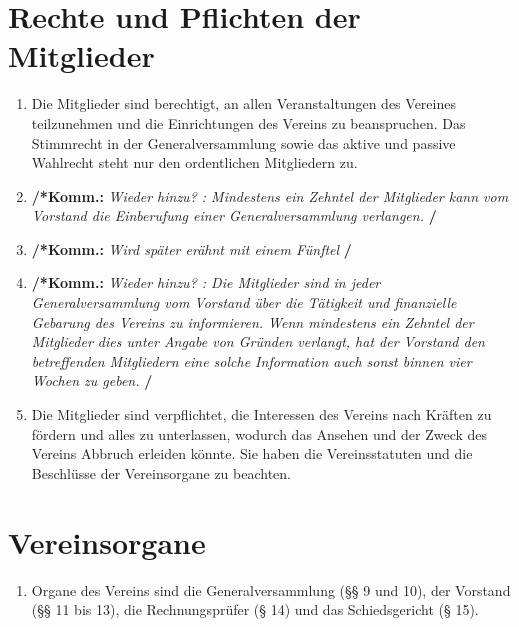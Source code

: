 \documentclass[a4paper,12pt]{article}
\newcommand{\comment}[1]{{\bf /*Komm.:} \textit{#1} {\bf */}}
\begin{document}
\section{Rechte und Pflichten der Mitglieder} %
\label{sec:rechte-und-pflichten}
\begin{enumerate}
\item\label{item:mitglieder-stimmrecht} Die Mitglieder sind berechtigt, an allen Veranstaltungen des Vereines teilzunehmen und die Einrichtungen des Vereins zu beanspruchen. Das Stimmrecht in der Generalversammlung sowie das aktive und passive Wahlrecht steht nur den ordentlichen Mitgliedern zu.

\item \comment{Wieder hinzu? : Mindestens ein Zehntel der Mitglieder kann vom Vorstand die Einberufung einer Generalversammlung verlangen.}
\item \comment{Wird sp\"ater er\"ahnt mit einem F\"unftel}
\item \comment{Wieder hinzu? : Die Mitglieder sind in jeder Generalversammlung vom Vorstand über die Tätigkeit und finanzielle Gebarung des Vereins zu informieren. Wenn mindestens ein Zehntel der Mitglieder dies unter Angabe von Gründen verlangt, hat der Vorstand den betreffenden Mitgliedern eine solche Information auch sonst binnen vier Wochen zu geben.}

\item Die Mitglieder sind verpflichtet, die Interessen des Vereins nach Kräften zu fördern und alles zu unterlassen, wodurch das Ansehen und der Zweck des Vereins Abbruch erleiden könnte. Sie haben die Vereinsstatuten und die Beschlüsse der Vereinsorgane zu beachten.
\end{enumerate}

\section{Vereinsorgane} %
\begin{enumerate}
\item Organe des Vereins sind die Generalversammlung (§§ 9 und 10), der Vorstand (§§ 11 bis 13), die Rechnungsprüfer (§ 14) und das Schiedsgericht (§ 15).
\end{enumerate}
\end{document}
